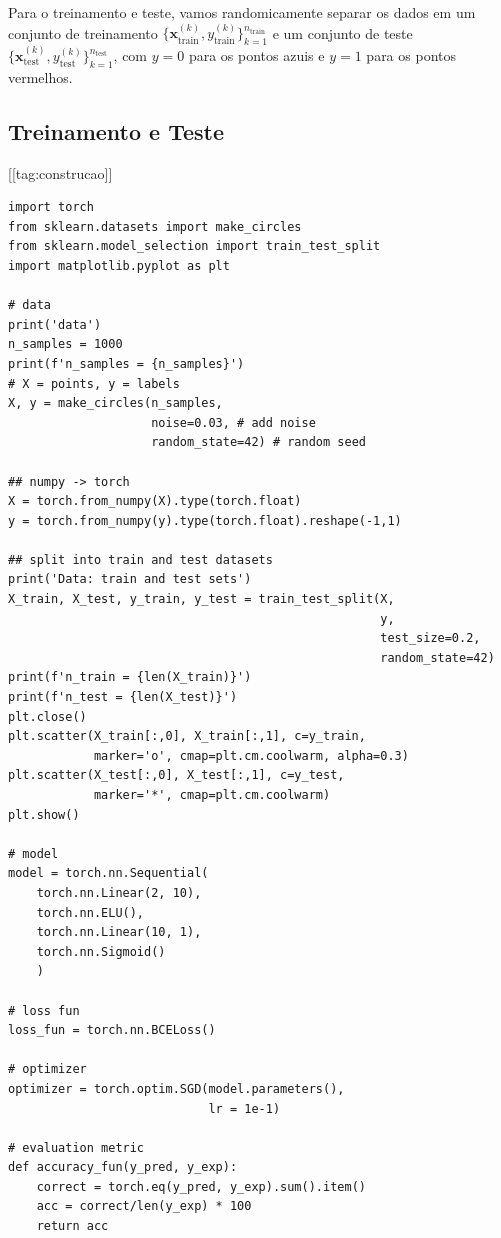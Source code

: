 Para o treinamento e teste, vamos randomicamente separar os dados em um conjunto de treinamento $\{\pmb{x}_{\text{train}}^{(k)}, y_{\text{train}}^{(k)}\}_{k=1}^{n_{\text{train}}}$ e um conjunto de teste $\{\pmb{x}_{\text{test}}^{(k)}, y_{\text{test}}^{(k)}\}_{k=1}^{n_{\text{test}}}$, com $y=0$ para os pontos azuis e $y=1$ para os pontos vermelhos.

\subsection{Treinamento e Teste}

[[tag:construcao]]

\begin{lstlisting}[caption=mlp\_classbin.py, label=cap_mlp_sec_classbin:cod:classbin]
import torch
from sklearn.datasets import make_circles
from sklearn.model_selection import train_test_split
import matplotlib.pyplot as plt

# data
print('data')
n_samples = 1000
print(f'n_samples = {n_samples}')
# X = points, y = labels
X, y = make_circles(n_samples,
                    noise=0.03, # add noise
                    random_state=42) # random seed

## numpy -> torch
X = torch.from_numpy(X).type(torch.float)
y = torch.from_numpy(y).type(torch.float).reshape(-1,1)

## split into train and test datasets
print('Data: train and test sets')
X_train, X_test, y_train, y_test = train_test_split(X,
                                                    y,
                                                    test_size=0.2,
                                                    random_state=42)
print(f'n_train = {len(X_train)}')
print(f'n_test = {len(X_test)}')
plt.close()
plt.scatter(X_train[:,0], X_train[:,1], c=y_train,
            marker='o', cmap=plt.cm.coolwarm, alpha=0.3)
plt.scatter(X_test[:,0], X_test[:,1], c=y_test,
            marker='*', cmap=plt.cm.coolwarm)
plt.show()

# model
model = torch.nn.Sequential(
    torch.nn.Linear(2, 10),
    torch.nn.ELU(),
    torch.nn.Linear(10, 1),
    torch.nn.Sigmoid()
    )

# loss fun
loss_fun = torch.nn.BCELoss()

# optimizer
optimizer = torch.optim.SGD(model.parameters(),
                            lr = 1e-1)

# evaluation metric
def accuracy_fun(y_pred, y_exp):
    correct = torch.eq(y_pred, y_exp).sum().item()
    acc = correct/len(y_exp) * 100
    return acc


\end{lstlisting}

